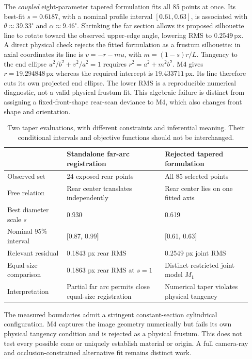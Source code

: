 \documentclass[11pt,letterpaper]{article}
\newcommand{\px}{\,\mathrm{px}}
\begin{document}
The \emph{coupled} eight-parameter tapered formulation fits all 85 points at once. Its best-fit \(s=0.6187\), with a nominal profile interval \([0.61,0.63]\), is associated with \(\theta\approx39.33^\circ\) and \(\alpha\approx9.46^\circ\). Shrinking the far section allows its proposed silhouette line to rotate toward the observed upper-edge angle, lowering RMS to \(0.2549\px\). A direct physical check rejects the fitted formulation as a frustum silhouette: in axial coordinates its line is $v=-r-mu$, with $m=(1-s)r/L$. Tangency to the end ellipse $u^2/b^2+v^2/a^2=1$ requires $r^2=a^2+m^2b^2$. M4 gives $r=19.294848\px$ whereas the required intercept is $19.433711\px$. Its line therefore cuts its own projected end ellipse. The lower RMS is a reproducible numerical diagnostic, not a valid physical frustum fit. This algebraic failure is distinct from assigning a fixed-front-shape rear-scan deviance to M4, which also changes front shape and orientation.

\begin{table}[ht]
\centering\small
\caption{Two taper evaluations, with different constraints and inferential meaning. Their conditional intervals and objective functions should not be interchanged.}
\label{tab:taper}
\begin{tabularx}{\linewidth}{@{}l X X@{}}
\toprule
 & \textbf{Standalone far-arc registration} & \textbf{Rejected tapered formulation} \\
\midrule
Observed set & 24 exposed rear points & All 85 selected points \\
Free relation & Rear center translates independently & Rear center lies on one fitted axis \\
Best diameter scale \(s\) & 0.930 & 0.619 \\
Nominal 95\% interval & [0.87, 0.99] & [0.61, 0.63] \\
Relevant residual & 0.1843 px rear RMS & 0.2549 px joint RMS \\
Equal-size comparison & 0.1863 px rear RMS at \(s=1\) & Distinct restricted joint model \(M_1\) \\
Interpretation & Partial far arc permits close equal-size registration & Numerical taper violates physical tangency \\
\bottomrule
\end{tabularx}
\end{table}

The measured boundaries admit a stringent constant-section cylindrical configuration. M4 captures the image geometry numerically but fails its own physical tangency condition and is rejected as a physical frustum. This does not test every possible cone or uniquely establish material or origin. A full camera-ray and occlusion-constrained alternative fit remains distinct work.
\end{document}
